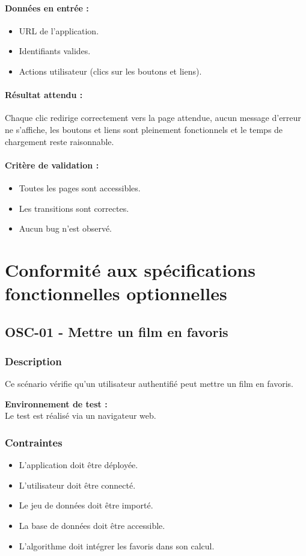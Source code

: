 \documentclass[a4paper,12pt]{report}
\begin{document}
\subsubsection{Données en entrée :}
\begin{itemize}
    \item URL de l’application.
    \item Identifiants valides.
    \item Actions utilisateur (clics sur les boutons et liens).
\end{itemize}
 
\subsubsection{Résultat attendu :}
Chaque clic redirige correctement vers la page attendue, aucun message d’erreur ne s’affiche, les boutons et liens sont pleinement fonctionnels et le temps de chargement reste raisonnable.

\subsubsection{Critère de validation :}
\begin{itemize}
    \item Toutes les pages sont accessibles.
    \item Les transitions sont correctes.
    \item Aucun bug n'est observé.

\end{itemize}
\newpage
\chapter{Conformité aux spécifications fonctionnelles optionnelles} 
\section{OSC-01 - Mettre un film en favoris}
\label{Fi4}
\subsection*{Description}
Ce scénario vérifie qu'un utilisateur authentifié peut mettre un film en favoris.

\textbf{Environnement de test :}\\
Le test est réalisé via un navigateur web.
\subsection*{Contraintes}
\begin{itemize}
    \item L'application doit être déployée.
    \item L'utilisateur doit être connecté.
    \item Le jeu de données doit être importé.
    \item La base de données doit être accessible.
    \item L'algorithme doit intégrer les favoris dans son calcul.
\end{itemize}
\end{document}
